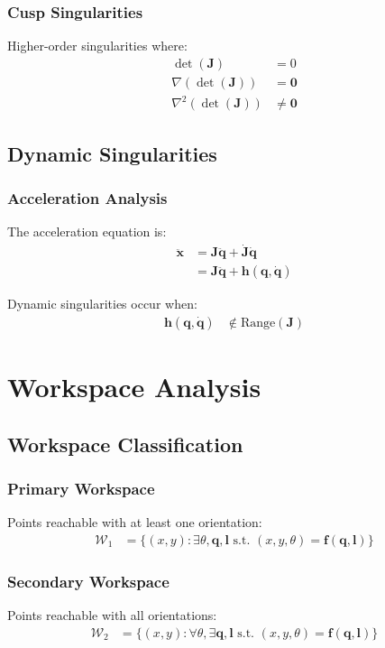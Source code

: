 \documentclass[11pt,a4paper]{article}
\begin{document}
\subsubsection{Cusp Singularities}
Higher-order singularities where:
\begin{align}
\det(\bm{J}) &= 0 \\
\nabla(\det(\bm{J})) &= \bm{0} \\
\nabla^2(\det(\bm{J})) &\neq \bm{0}
\end{align}

\subsection{Dynamic Singularities}

\subsubsection{Acceleration Analysis}
The acceleration equation is:
\begin{align}
\ddot{\bm{x}} &= \bm{J}\ddot{\bm{q}} + \dot{\bm{J}}\dot{\bm{q}} \\
&= \bm{J}\ddot{\bm{q}} + \bm{h}(\bm{q}, \dot{\bm{q}})
\end{align}

Dynamic singularities occur when:
\begin{align}
\bm{h}(\bm{q}, \dot{\bm{q}}) &\notin \text{Range}(\bm{J})
\end{align}

\section{Workspace Analysis}

\subsection{Workspace Classification}

\subsubsection{Primary Workspace}
Points reachable with at least one orientation:
\begin{align}
\mathcal{W}_1 &= \{(x, y) : \exists \theta, \bm{q}, \bm{l} \text{ s.t. } (x, y, \theta) = \bm{f}(\bm{q}, \bm{l})\}
\end{align}

\subsubsection{Secondary Workspace}  
Points reachable with all orientations:
\begin{align}
\mathcal{W}_2 &= \{(x, y) : \forall \theta, \exists \bm{q}, \bm{l} \text{ s.t. } (x, y, \theta) = \bm{f}(\bm{q}, \bm{l})\}
\end{align}
\end{document}
